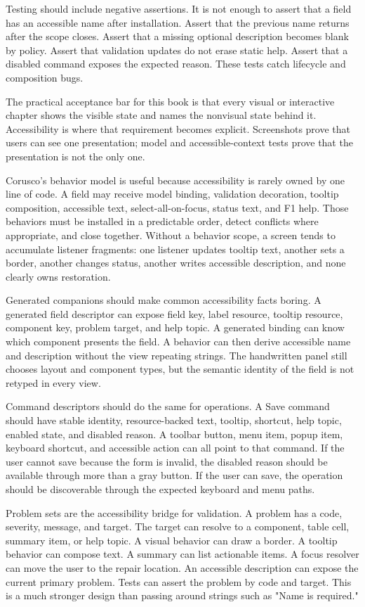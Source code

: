 Testing should include negative assertions. It is not enough to assert that a field has an accessible name after installation. Assert that the previous name returns after the scope closes. Assert that a missing optional description becomes blank by policy. Assert that validation updates do not erase static help. Assert that a disabled command exposes the expected reason. These tests catch lifecycle and composition bugs.

The practical acceptance bar for this book is that every visual or interactive chapter shows the visible state and names the nonvisual state behind it. Accessibility is where that requirement becomes explicit. Screenshots prove that users can see one presentation; model and accessible-context tests prove that the presentation is not the only one.

Corusco's behavior model is useful because accessibility is rarely owned by one
line of code. A field may receive model binding, validation decoration, tooltip
composition, accessible text, select-all-on-focus, status text, and F1 help.
Those behaviors must be installed in a predictable order, detect conflicts
where appropriate, and close together. Without a behavior scope, a screen tends
to accumulate listener fragments: one listener updates tooltip text, another
sets a border, another changes status, another writes accessible description,
and none clearly owns restoration.

Generated companions should make common accessibility facts boring. A generated
field descriptor can expose field key, label resource, tooltip resource,
component key, problem target, and help topic. A generated binding can know
which component presents the field. A behavior can then derive accessible name
and description without the view repeating strings. The handwritten panel still
chooses layout and component types, but the semantic identity of the field is
not retyped in every view.

Command descriptors should do the same for operations. A Save command should
have stable identity, resource-backed text, tooltip, shortcut, help topic,
enabled state, and disabled reason. A toolbar button, menu item, popup item,
keyboard shortcut, and accessible action can all point to that command. If the
user cannot save because the form is invalid, the disabled reason should be
available through more than a gray button. If the user can save, the operation
should be discoverable through the expected keyboard and menu paths.

Problem sets are the accessibility bridge for validation. A problem has a code,
severity, message, and target. The target can resolve to a component, table
cell, summary item, or help topic. A visual behavior can draw a border. A tooltip
behavior can compose text. A summary can list actionable items. A focus resolver
can move the user to the repair location. An accessible description can expose
the current primary problem. Tests can assert the problem by code and target.
This is a much stronger design than passing around strings such as "Name is
required."

